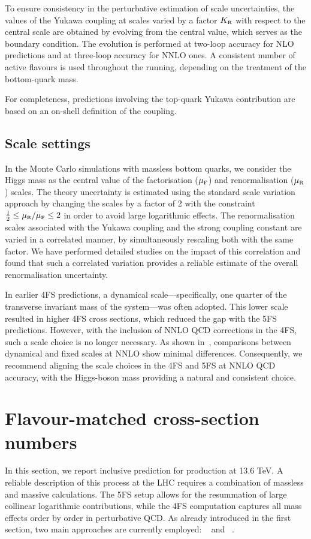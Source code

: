 \documentclass[11pt,a4paper]{article}
\begin{document}
To ensure consistency in the perturbative estimation of scale uncertainties, the values of the Yukawa coupling at scales varied by a factor $\KR$ with respect to the central scale are obtained by evolving from the central value, which serves as the boundary condition. The evolution is performed at two-loop accuracy for NLO predictions and at three-loop accuracy for NNLO ones. A consistent number of active flavours is used throughout the running, depending on the treatment of the bottom-quark mass.

For completeness, predictions involving the top-quark Yukawa contribution are based on an on-shell definition of the coupling.

\subsection{Scale settings}
In the Monte Carlo simulations with massless bottom quarks, we consider the Higgs mass as the central value of the factorisation ($\muF$) and renormalisation ($\muR$) scales. The theory uncertainty is estimated using the standard scale variation approach by changing the scales by a factor of 2 with the constraint $\frac{1}{2}\leq\muR/\muF\leq 2$ in order to avoid large logarithmic effects. The renormalisation scales associated with the Yukawa coupling and the strong coupling constant are varied in a correlated manner, by simultaneously rescaling both with the same factor. We have performed detailed studies on the impact of this correlation and found that such a correlated variation provides a reliable estimate of the overall renormalisation uncertainty.

In earlier 4FS predictions, a dynamical scale—specifically, one quarter of the transverse invariant mass of the \bbH{} system—was often adopted. This lower scale resulted in higher 4FS cross sections, which reduced the gap with the 5FS predictions. However, with the inclusion of NNLO QCD corrections in the 4FS, such a scale choice is no longer necessary. As shown in~, comparisons between dynamical and fixed scales at NNLO show minimal differences. Consequently, we recommend aligning the scale choices in the 4FS and 5FS at NNLO QCD accuracy, with the Higgs-boson mass providing a natural and consistent choice.

\section{Flavour-matched cross-section numbers}\label{sec:matchedinclusivenumbers}
In this section, we report inclusive prediction for \bbH{} production at 13.6 TeV. A reliable description of this process at the LHC requires a combination of massless and massive calculations. The 5FS setup allows for the resummation of large collinear logarithmic contributions, while the 4FS computation captures all mass effects order by order in perturbative QCD. As already introduced in the first section, two main approaches are currently employed: \fonll{}~\cite{forte:2015hba,forte:2016sja,Duhr:2020kzd} and \nlonnllpart{}~\cite{Bonvini:2015pxa,Bonvini:2016fgf}. 
\end{document}

